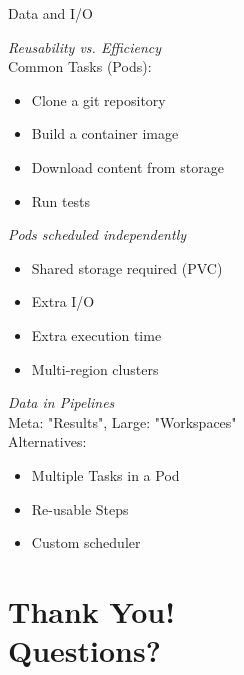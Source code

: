 \documentclass[aspectratio=169,11pt,hyperref={colorlinks=true}]{beamer}
\begin{document}
\begin{3squares}%
  {%
    Data and I/O
  }%
  {%
  \textit{Reusability vs. Efficiency} \\
  \vspace{0.04\paperheight}
  Common Tasks (\faArrowRight Pods):
  \begin{itemize}
    \item Clone a git repository
    \item Build a container image
    \item Download content from storage
    \item Run tests
  \end{itemize}
  }%
  {%
  \textit{Pods scheduled independently} \\
  \begin{itemize}
    \item Shared storage required (PVC)
    \item Extra I/O
    \item Extra execution time
    \item Multi-region clusters
  \end{itemize}
  }%
  {%
  \textit{Data in Pipelines} \\
  \vspace{0.02\paperheight}
  Meta: "Results", Large: "Workspaces" \\
  \vspace{0.01\paperheight}
  Alternatives: \\
  \begin{itemize}
    \item Multiple Tasks in a Pod
    \item Re-usable Steps
    \item Custom scheduler
  \end{itemize}
  }%
\end{3squares}

\section[Q\&A]{Thank You! \\Questions?}
\end{document}
